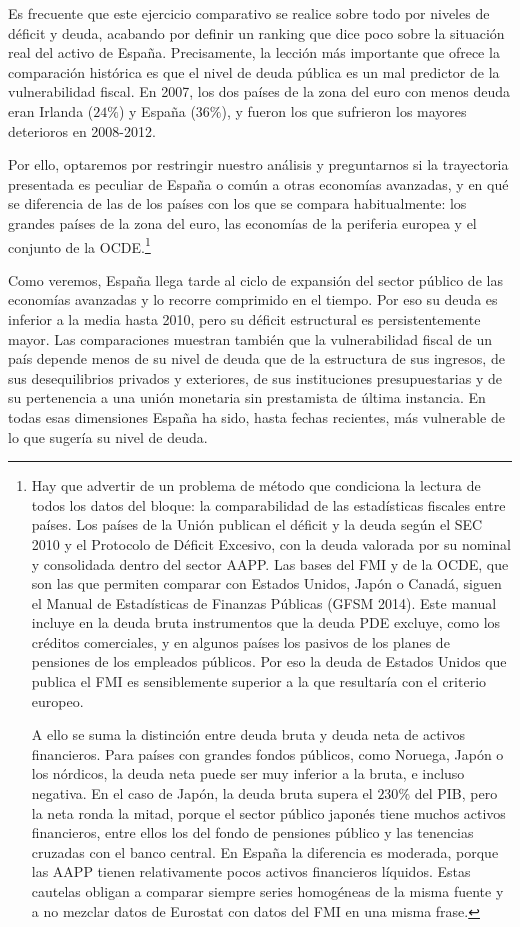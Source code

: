 \documentclass[10pt,a4paper]{article}
\begin{document}
Es frecuente que este ejercicio comparativo se realice sobre todo por niveles de déficit y deuda, acabando por definir un ranking que dice poco sobre la situación real del activo de España. Precisamente, la lección más importante que ofrece la comparación histórica es que el nivel de deuda pública es un mal predictor de la vulnerabilidad fiscal. En 2007, los dos países de la zona del euro con menos deuda eran Irlanda ($24\%$) y España ($36\%$), y fueron los que sufrieron los mayores deterioros en 2008-2012. 

Por ello, optaremos por restringir nuestro análisis y preguntarnos si la trayectoria presentada es peculiar de España o común a otras economías avanzadas, y en qué se diferencia de las de los países con los que se compara habitualmente: los grandes países de la zona del euro, las economías de la periferia europea y el conjunto de la OCDE.\footnote{
Hay que advertir de un problema de método que condiciona la lectura de todos los datos del bloque: la comparabilidad de las estadísticas fiscales entre países. Los países de la Unión publican el déficit y la deuda según el SEC 2010 y el Protocolo de Déficit Excesivo, con la deuda valorada por su nominal y consolidada dentro del sector AAPP. Las bases del FMI y de la OCDE, que son las que permiten comparar con Estados Unidos, Japón o Canadá, siguen el Manual de Estadísticas de Finanzas Públicas (GFSM 2014). Este manual incluye en la deuda bruta instrumentos que la deuda PDE excluye, como los créditos comerciales, y en algunos países los pasivos de los planes de pensiones de los empleados públicos. Por eso la deuda de Estados Unidos que publica el FMI es sensiblemente superior a la que resultaría con el criterio europeo.

A ello se suma la distinción entre deuda bruta y deuda neta de activos financieros. Para países con grandes fondos públicos, como Noruega, Japón o los nórdicos, la deuda neta puede ser muy inferior a la bruta, e incluso negativa. En el caso de Japón, la deuda bruta supera el $230\%$ del PIB, pero la neta ronda la mitad, porque el sector público japonés tiene muchos activos financieros, entre ellos los del fondo de pensiones público y las tenencias cruzadas con el banco central. En España la diferencia es moderada, porque las AAPP tienen relativamente pocos activos financieros líquidos. Estas cautelas obligan a comparar siempre series homogéneas de la misma fuente y a no mezclar datos de Eurostat con datos del FMI en una misma frase.
}

Como veremos, España llega tarde al ciclo de expansión del sector público de las economías avanzadas y lo recorre comprimido en el tiempo. Por eso su deuda es inferior a la media hasta 2010, pero su déficit estructural es persistentemente mayor. Las comparaciones muestran también que la vulnerabilidad fiscal de un país depende menos de su nivel de deuda que de la estructura de sus ingresos, de sus desequilibrios privados y exteriores, de sus instituciones presupuestarias y de su pertenencia a una unión monetaria sin prestamista de última instancia. En todas esas dimensiones España ha sido, hasta fechas recientes, más vulnerable de lo que sugería su nivel de deuda.
\end{document}

